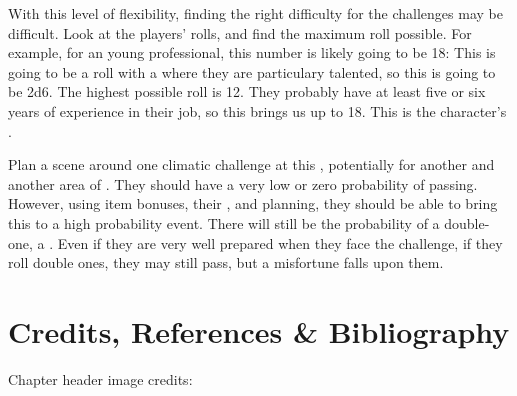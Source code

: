 \documentclass{LegrandOrangeTufteBook}
\begin{document}
With this level of flexibility, finding the right difficulty for the challenges may be difficult. Look at the players' rolls, and find the maximum roll possible. For example, for an young professional,
this number is likely going to be 18: This is going to be a roll with a  where they are particulary talented, so this is going to be 2d6. The highest possible roll is 12. They probably have at least five or six years of experience in their job, so this brings us up to 18. This is the character's .

Plan a scene around one climatic challenge at this , potentially for another  and another area of . They should have a very low or zero probability of passing. However, using item bonuses, their , and planning, they should be able to bring this to a high probability event. There will still be the probability of a double-one, a . Even if they are very well prepared when they face the challenge, if they roll double ones, they may still pass, but a misfortune falls upon them.

\section*{Credits, References \& Bibliography}

Chapter header image credits: \cite{baby_faces}

\printbibliography[heading=none]
\end{document}
